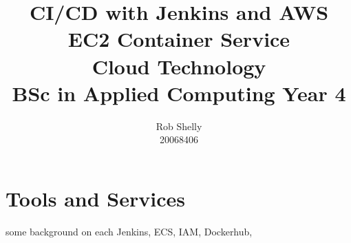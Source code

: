 \documentclass[a4paper]{article}
\title{CI/CD with Jenkins and AWS EC2 Container Service \\ \small{Cloud Technology \\ BSc in Applied Computing Year 4}}
\author{Rob Shelly \\ \small{20068406}}
\begin{document}
\maketitle
\thispagestyle{empty} %

\newpage
{}
\tableofcontents

\newpage
{}


\section{Tools and Services}
some background on each Jenkins, ECS, IAM, Dockerhub,





\newpage
\renewcommand*{\bibfont}{\raggedright}



\begin{appendices}
	
	
\end{appendices}
\end{document}
